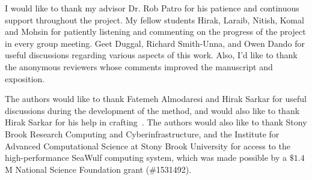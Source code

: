 \documentclass[
11pt, %
english, %
singlespacing, %
headsepline, %
]{main} %
\begin{document}
\begin{acknowledgements}
\addchaptertocentry{\acknowledgementname} %

I would like to thank my advisor Dr. Rob Patro for his patience and continuous support throughout the project. My fellow students Hirak, Laraib, Nitish, Komal and Mohsin for patiently listening and commenting on the progress of the project in every group meeting. Geet Duggal, Richard Smith-Unna, and Owen Dando for useful discussions regarding various aspects of this work. Also, I'd like to thank the anonymous reviewers whose comments improved the \rapmap manuscript and exposition.

The authors would like to thank Fatemeh Almodaresi and Hirak Sarkar for useful discussions during the development of the \alevin method, and would also like to thank Hirak Sarkar for his help in crafting~. The authors would also like to thank Stony Brook Research Computing and Cyberinfrastructure, and the Institute for Advanced Computational Science at Stony Brook University for access to the high-performance SeaWulf computing system, which was made possible by a $\$1.4$M National Science Foundation grant (\#1531492).
\end{acknowledgements}


\tableofcontents %

\listoffigures %

\listoftables %

\end{document}
